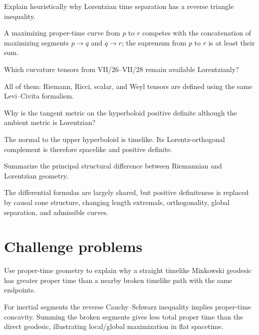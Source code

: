 \begin{problem}\label{prob:vii30-09}
Explain heuristically why Lorentzian time separation has a reverse triangle inequality.
\end{problem}
\begin{solution}
A maximizing proper-time curve from \(p\) to \(r\) competes with the concatenation of maximizing segments \(p\to q\) and \(q\to r\); the supremum from \(p\) to \(r\) is at least their sum.
\end{solution}

\begin{problem}\label{prob:vii30-10}
Which curvature tensors from VII/26--VII/28 remain available Lorentzianly?
\end{problem}
\begin{solution}
All of them: Riemann, Ricci, scalar, and Weyl tensors are defined using the same Levi--Civita formalism.
\end{solution}

\begin{problem}\label{prob:vii30-11}
Why is the tangent metric on the hyperboloid positive definite although the ambient metric is Lorentzian?
\end{problem}
\begin{solution}
The normal to the upper hyperboloid is timelike. Its Lorentz-orthogonal complement is therefore spacelike and positive definite.
\end{solution}

\begin{problem}\label{prob:vii30-12}
Summarize the principal structural difference between Riemannian and Lorentzian geometry.
\end{problem}
\begin{solution}
The differential formulas are largely shared, but positive definiteness is replaced by causal cone structure, changing length extremals, orthogonality, global separation, and admissible curves.
\end{solution}

\section{Challenge problems}
\begin{problem}\label{prob:vii30-ch01}
Use proper-time geometry to explain why a straight timelike Minkowski geodesic has greater proper time than a nearby broken timelike path with the same endpoints.
\end{problem}
\begin{solution}
For inertial segments the reverse Cauchy--Schwarz inequality implies proper-time concavity. Summing the broken segments gives less total proper time than the direct geodesic, illustrating local/global maximization in flat spacetime.
\end{solution}

